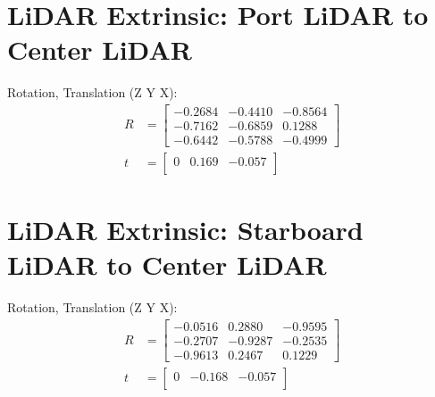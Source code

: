 \documentclass{erauthesis}
\begin{document}
\section{LiDAR Extrinsic: Port LiDAR to Center LiDAR}
Rotation, Translation (Z Y X):
\begin{subequations}
\begin{align}
R&=\left[\begin{array}{ccc}
-0.2684 & -0.4410 & -0.8564 \\
-0.7162 & -0.6859 & 0.1288 \\
-0.6442 & -0.5788 & -0.4999
\end{array}\right]\\
t&=\left[\begin{array}{ccc}
0 & 0.169 & -0.057 \\
\end{array}\right]
\end{align}
\end{subequations}

\section{LiDAR Extrinsic: Starboard LiDAR to Center LiDAR}
Rotation, Translation (Z Y X):
\begin{subequations}
\begin{align}
R&=\left[\begin{array}{ccc}
-0.0516 & 0.2880 & -0.9595 \\
-0.2707 & -0.9287 & -0.2535 \\
-0.9613 & 0.2467 & 0.1229
\end{array}\right]\\
t&=\left[\begin{array}{ccc}
0 & -0.168 & -0.057 \\
\end{array}\right]
\end{align}
\end{subequations}
\end{document}
